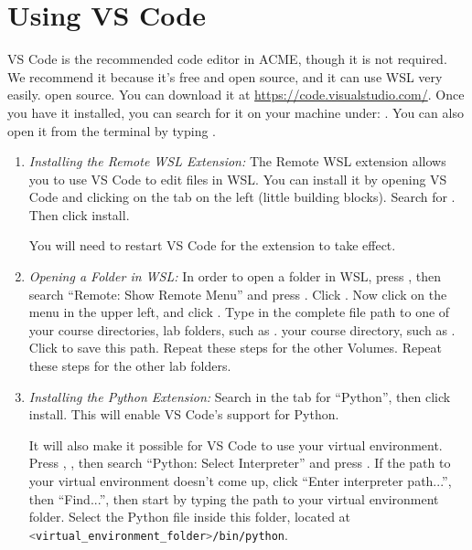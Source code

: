 \section*{Using VS Code}
VS Code is the recommended code editor in ACME, though it is not required.
We recommend it because it's free and
\ifwindows
open source, and it can use WSL very easily.
\else
open source.
\fi
You can download it at \url{https://code.visualstudio.com/}.
Once you have it installed, you can search for it on your machine under: .
You can also open it from the terminal by typing .
\begin{enumerate}
    \ifwindows

    \item \emph{Installing the Remote WSL Extension:}
    The Remote WSL extension allows you to use VS Code to edit files in WSL.
    You can install it by opening VS Code and clicking on the  tab on the left (little building blocks).
    Search for .
    Then click install.

    You will need to restart VS Code for the extension to take effect.
    \item \emph{Opening a Folder in WSL:}
    In order to open a folder in WSL, press , then search ``Remote: Show Remote Menu'' and press .
    Click .
    Now click on the  menu in the upper left, and click .
    Type in the complete file path to
    \ifbootcamp
    one of your
    \ifbyu
    course directories,
    \else
    lab folders,
    \fi 
    such as .
    \else 
    your course directory, such as .
    \fi
    Click  to save this path.
    \ifbootcamp
    \ifbyu
    Repeat these steps for the other Volumes.
    \else 
    Repeat these steps for the other lab folders.
    \fi
    \fi

    \fi
    
    \item \emph{Installing the Python Extension:}
    Search in the  tab for ``Python'', then click install.
    This will enable VS Code's support for Python.
    
    It will also make it possible for VS Code to use your virtual environment.
    Press
    \ifwindows
    ,
    \else
    ,
    \fi
    then search ``Python: Select Interpreter'' and press .
    If the path to your virtual environment doesn't come up, click ``Enter interpreter path...'', then ``Find...'', then start by typing the path to your virtual environment folder.
    Select the Python file inside this folder, located at \lstinline[language=bash]{<virtual_environment_folder>/bin/python}.
\end{enumerate}

